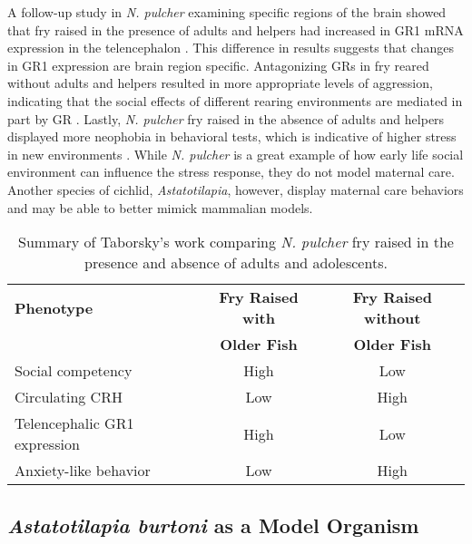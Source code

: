 \documentclass[12pt,twoside]{reedthesis}
\begin{document}
A follow-up study in \textit{N. pulcher} examining specific regions of the brain
showed that fry raised in the presence of adults and helpers had increased in
GR1 mRNA expression in the telencephalon \citep{nyman_effect_2017}. This difference in results suggests
that changes in GR1 expression are brain region specific. Antagonizing GRs in fry reared without adults and helpers resulted in more appropriate
levels of aggression, indicating that the social effects of different rearing
environments are mediated in part by GR \citep{nyman_effect_2017}. Lastly,
\textit{N. pulcher} fry raised in
the absence of adults and helpers displayed more neophobia in behavioral tests,
which is indicative of higher stress in new environments
\citep{bannier_early_2017}. While \textit{N. pulcher} is a great example of how
early life social environment can influence the stress response, they do not
model maternal care. Another species of cichlid, \textit{Astatotilapia},
however, display maternal care behaviors and may be able to better mimick
mammalian models.

\begin{table}[htbp]
\caption[Summary of Taborsky's work comparing \textit{N. pulcher} fry raised in the presence and absence
of adults and adolescents]{Summary of Taborsky's work comparing \textit{N. pulcher} fry raised in the presence and absence
of adults and adolescents.}
\begin{center}
\footnotesize
\begin{tabular}{ | l | c | c | }
  \hline
  \textbf{Phenotype} & \textbf{Fry Raised with} & \textbf{Fry Raised without} \\
  & \textbf{Older Fish} & \textbf{Older Fish} \\
\hline
  Social competency & High & Low\\
\hline
  Circulating CRH & Low & High\\
\hline
  Telencephalic GR1 expression & High & Low\\
\hline
  Anxiety-like behavior & Low & High\\
\hline
\end{tabular}
\end{center}
\end{table}

\subsection{\textit{Astatotilapia burtoni} as a Model Organism}
\end{document}
